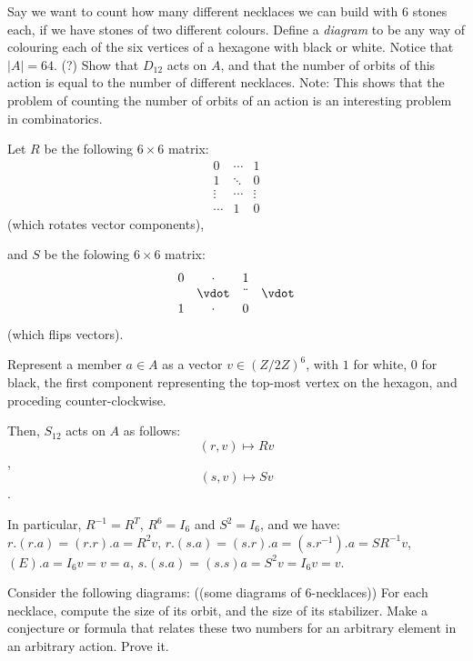 \documentclass[1    0pt, answers]{exam} \renewcommand{\baselinestretch}{1.05}
\theoremstyle{plain}
\theoremstyle{definition}
\begin{document}
\begin{questions}
\question Say we want to count how many different necklaces we can build with 6 stones each, if we have stones of two different colours. Define a \emph{diagram} to be any way of colouring each of the six vertices of a hexagone with black or white. Notice that $|A| = 64$. (?) Show that $D_{12}$ acts on $A$, and that the number of orbits of this action is equal to the number of different necklaces.
Note: This shows that the problem of counting the number of orbits of an action is an interesting problem in combinatorics.

\begin{solution}
Let $R$ be the following $6 \times 6$ matrix:
\[
\begin{matrix}
0 & \cdots & 1\\
1 & \ddots & 0\\
\vdots & \cdots & \vdots\\
\cdots & 1 & 0
\end{matrix}
\]
(which rotates vector components),

and $S$ be the folowing $6 \times 6$ matrix:
\[
\begin{matrix}
0 & \cdot & 1\\
& \vdot & \ddot & \vdot\\
1 & \cdot & 0
\end{matrix}
\]
(which flips vectors).

Represent a member $a \in A$ as a vector $v \in (Z/2Z)^6$, with $1$ for white, $0$ for black, the first component representing the top-most vertex on the hexagon, and proceding counter-clockwise.

Then, $S_12$ acts on $A$ as follows:
$$(r, v) \mapsto Rv$$,
$$(s, v) \mapsto Sv$$.

In particular, $R^{-1} = R^T$, $R^6 = I_6$ and $S^2 = I_6$, and we have:
$r.(r.a) = (r.r).a = R^2 v$,
$r.(s.a) = (s.r).a = (s.r^{-1}).a = S R^{-1} v$,
$(E).a = I_6 v = v = a$,
$s.(s.a) = (s.s)a = S^2 v = I_6 v = v$.


\end{solution}
\question Consider the following diagrams: ((some diagrams of 6-necklaces))
For each necklace, compute the size of its orbit, and the size of its stabilizer. Make a conjecture or formula that relates these two numbers for an arbitrary element in an arbitrary action. Prove it.
\end{questions}
\end{document}
